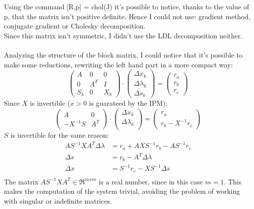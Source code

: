 \documentclass[]{article}
\begin{document}
Using the command [R,p] = chol(J) it's possible to notice, thanks to the value of p, that the matrix isn't positive definite. Hence I could not use: gradient method, conjugate gradient or Cholesky decomposition.\\
Since this matrix isn't symmetric, I didn't use the LDL decomposition neither.\\\\
Analyzing the structure of the block matrix, I could notice that it's possible to make some reductions, rewriting the left hand part in a more compact way:
\begin{equation*}
\begin{pmatrix}
A & 0 & 0 \\[0.3em]
0 & A^T & I \\[0.3em]
S_k & 0 & X_k           
\end{pmatrix}
\cdot 
\begin{pmatrix}
\Delta x_k \\[0.3em]
\Delta \lambda_k \\[0.3em]
\Delta s_k           
\end{pmatrix}
= 
\begin{pmatrix}
r_a \\[0.3em]
r_b \\[0.3em]
r_c         
\end{pmatrix}
\end{equation*}
Since $X$ is invertible ($x > 0$ is guarateed by the IPM):
\begin{equation*}
	\begin{pmatrix}
	A & 0\\
	-X^{-1}S & A^T
	\end{pmatrix}
	\cdot
	\begin{pmatrix}
	\Delta x_k \\[0.3em]
	\Delta \lambda_k \\[0.3em]
	\end{pmatrix}
	=
	\begin{pmatrix}
	r_a\\
	r_b-X^{-1}r_c
	\end{pmatrix}
\end{equation*}
$S$ is invertible for the same reason:
\begin{equation*}
	\begin{split}
	AS^{-1}XA^T\Delta\lambda&=r_a+AXS^{-1}r_b-AS^{-1}r_c\\
	\Delta s &= r_b-A^T\Delta \lambda\\
	\Delta x &= S^{-1}r_c-XS^{-1}\Delta s\\
	\end{split}
\end{equation*}
The matrix $AS^{-1}XA^T \in \Re^{mxm}$ is a real number, since in this case $m=1$. This makes the computation of the system trivial, avoiding the problem of working with singular or indefinite matrices.
\end{document}
